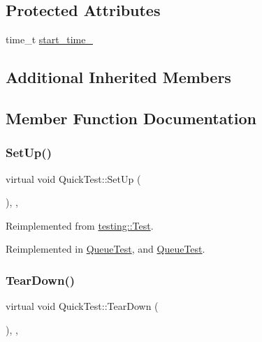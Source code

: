 \subsection*{Protected Attributes}
\begin{DoxyCompactItemize}
\item 
time\+\_\+t \hyperlink{class_quick_test_aba6a28bbd733e72e3b088a0b66386809}{start\+\_\+time\+\_\+}
\end{DoxyCompactItemize}
\subsection*{Additional Inherited Members}


\subsection{Member Function Documentation}
\mbox{\label{class_quick_test_ae52ad082887512b92240ce40a1a05650}} 
\subsubsection{\texorpdfstring{Set\+Up()}{SetUp()}}
{\footnotesize\ttfamily virtual void Quick\+Test\+::\+Set\+Up (\begin{DoxyParamCaption}{ }\end{DoxyParamCaption})\hspace{0.3cm}{\ttfamily [inline]}, {\ttfamily [protected]}, {\ttfamily [virtual]}}



Reimplemented from \hyperlink{classtesting_1_1_test_a190315150c303ddf801313fd1a777733}{testing\+::\+Test}.



Reimplemented in \hyperlink{class_queue_test_a91e69958f086239a523864d6b94ab174}{Queue\+Test}, and \hyperlink{class_queue_test_a91e69958f086239a523864d6b94ab174}{Queue\+Test}.

\mbox{\label{class_quick_test_a6b2d16cc0c69d30a16fe612db5abfc39}} 
\subsubsection{\texorpdfstring{Tear\+Down()}{TearDown()}}
{\footnotesize\ttfamily virtual void Quick\+Test\+::\+Tear\+Down (\begin{DoxyParamCaption}{ }\end{DoxyParamCaption})\hspace{0.3cm}{\ttfamily [inline]}, {\ttfamily [protected]}, {\ttfamily [virtual]}}



